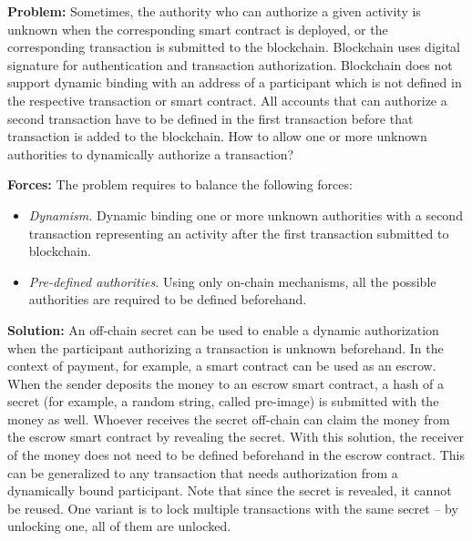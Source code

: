 \vspace{0.5em}\noindent \textbf{Problem:} 
Sometimes, the authority who can authorize a given activity is unknown when the corresponding smart contract is deployed, or the corresponding transaction is submitted to the blockchain. Blockchain uses digital signature for authentication and transaction authorization. Blockchain does not support dynamic binding with an address of a participant which is not defined in the respective transaction or smart contract. All accounts that can authorize a second transaction have to be defined in the first transaction before that transaction is added to the blockchain. How to allow one or more unknown authorities to dynamically authorize a transaction?


\vspace{0.5em}\noindent \textbf{Forces:} The problem requires to balance the following forces:
\begin{itemize}
  \item \textit{Dynamism.} Dynamic binding one or more unknown authorities with a second transaction representing an activity after the first transaction submitted to blockchain.
  \item \textit{Pre-defined authorities.} Using only on-chain mechanisms, all the possible authorities are required to be defined beforehand.
\end{itemize}

\vspace{0.5em}\noindent \textbf{Solution:} 
An off-chain secret can be used to enable a dynamic authorization when the participant authorizing a transaction is unknown beforehand. In the context of payment, for example, a smart contract can be used as an escrow. When the sender deposits the money to an escrow smart contract, a hash of a secret (for example, a random string, called pre-image) is submitted with the money as well. Whoever receives the secret off-chain can claim the money from the escrow smart contract by revealing the secret.
With this solution, the receiver of the money does not need to be defined beforehand in the escrow contract. This can be generalized to any transaction that needs authorization from a dynamically bound participant. Note that since the secret is revealed, it cannot be reused. One variant is to lock multiple transactions with the same secret -- by unlocking one, all of them are unlocked. 


